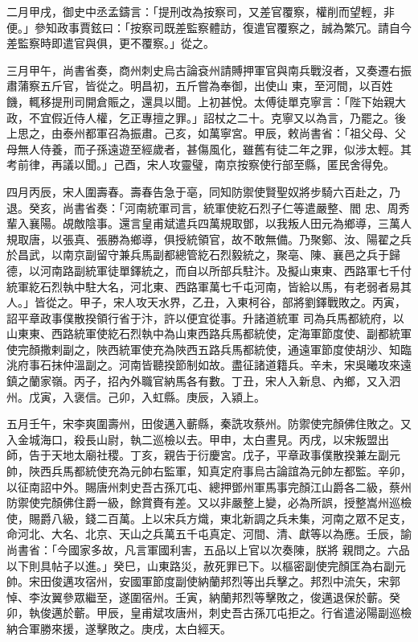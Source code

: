 \begin{pinyinscope}
 二月甲戌，御史中丞孟鑄言：「提刑改為按察司，又差官覆察，權削而望輕，非便。」參知政事賈鉉曰：「按察司既差監察體訪，復遣官覆察之，誠為繁冗。請自今差監察時即遣官與俱，更不覆察。」從之。



 三月甲午，尚書省奏，商州刺史烏古論袞州請賻押軍官與南兵戰沒者，又奏遷右振肅蒲察五斤官，皆從之。明昌初，五斤嘗為奉御，出使山
 東，至河間，以百姓饑，輒移提刑司開倉賑之，還具以聞。上初甚悅。太傅徒單克寧言：「陛下始親大政，不宜假近侍人權，乞正專擅之罪。」詔杖之二十。克寧又以為言，乃罷之。後上思之，由泰州都軍召為振肅。己亥，如萬寧宮。甲辰，敕尚書省：「祖父母、父母無人侍養，而子孫遠遊至經歲者，甚傷風化，雖舊有徒二年之罪，似涉太輕。其考前律，再議以聞。」己酉，宋人攻靈璧，南京按察使行部至縣，匿民舍得免。



 四月丙辰，宋人圍壽春。壽春告急于亳，同知防禦使賢聖奴將步騎六百赴之，乃退。癸亥，尚書省奏：「河南統軍司言，統軍使紇石烈子仁等遣嚴整、閻
 忠、周秀輩入襄陽。覘敵陰事。還言皇甫斌遣兵四萬規取鄧，以我叛人田元為鄉導，三萬人規取唐，以張真、張勝為鄉導，俱授統領官，故不敢無備。乃聚鄭、汝、陽翟之兵於昌武，以南京副留守兼兵馬副都總管紇石烈毅統之，聚亳、陳、襄邑之兵于歸德，以河南路副統軍徒單鐸統之，而自以所部兵駐汴。及擬山東東、西路軍七千付統軍紇石烈執中駐大名，河北東、西路軍萬七千屯河南，皆給以馬，有老弱者易其人。」皆從之。甲子，宋人攻天水界，乙丑，入東柯谷，部將劉鐸戰敗之。丙寅，詔平章政事僕散揆領行省于汴，許以便宜從事。升諸道統軍
 司為兵馬都統府，以山東東、西路統軍使紇石烈執中為山東西路兵馬都統使，定海軍節度使、副都統軍使完顏撒剌副之，陜西統軍使充為陜西五路兵馬都統使，通遠軍節度使胡沙、知臨洮府事石抹仲溫副之。河南皆聽揆節制如故。盡征諸道籍兵。辛未，宋吳曦攻來遠鎮之蘭家嶺。丙子，招內外職官納馬各有數。丁丑，宋人入新息、內鄉，又入泗州。戊寅，入褒信。己卯，入虹縣。庚辰，入潁上。



 五月壬午，宋李爽圍壽州，田俊邁入蘄縣，秦詵攻蔡州。防禦使完顏佛住敗之。又入金城海口，殺長山尉，執二巡檢以去。甲申，太白晝見。丙戌，以宋叛盟出
 師，告于天地太廟社稷。丁亥，親告于衍慶宮。戊子，平章政事僕散揆兼左副元帥，陜西兵馬都統使充為元帥右監軍，知真定府事烏古論誼為元帥左都監。辛卯，以征南詔中外。賜唐州刺史吾古孫兀屯、總押鄧州軍馬事完顏江山爵各二級，蔡州防禦使完顏佛住爵一級，餘賞賚有差。又以非嚴整上變，必為所誤，授整嵩州巡檢使，賜爵八級，錢二百萬。上以宋兵方熾，東北新調之兵未集，河南之眾不足支，命河北、大名、北京、天山之兵萬五千屯真定、河間、清、獻等以為應。壬辰，諭尚書省：「今國家多故，凡言軍國利害，五品以上官以次奏陳，朕將
 親問之。六品以下則具帖子以進。」癸巳，山東路災，赦死罪已下。以樞密副使完顏匡為右副元帥。宋田俊邁攻宿州，安國軍節度副使納蘭邦烈等出兵擊之。邦烈中流矢，宋郭悼、李汝翼參眾繼至，遂圍宿州。壬寅，納蘭邦烈等擊敗之，俊邁退保於蘄。癸卯，執俊邁於蘄。甲辰，皇甫斌攻唐州，刺史吾古孫兀屯拒之。行省遣泌陽副巡檢納合軍勝來援，遂擊敗之。庚戌，太白經天。




\end{pinyinscope}
